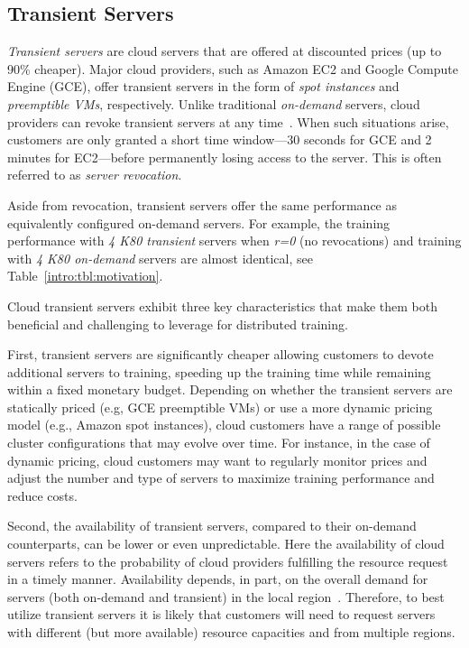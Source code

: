 \subsection{Transient Servers}
\label{subsec:transient}

\emph{Transient servers} are cloud servers that are offered at discounted
prices (up to 90\% cheaper). Major cloud providers, such as Amazon EC2 and
Google Compute Engine (GCE), offer transient servers in the form
of \emph{spot instances} and \emph{preemptible VMs}, respectively. Unlike traditional \emph{on-demand}
servers, cloud providers can revoke transient servers at any
time~\cite{ec2_spot,gce_preemptible}. When such situations arise, customers are
only granted a short time window---30 seconds for GCE and 2 minutes for
EC2---before permanently losing access to the server. This is often referred to
as \emph{server revocation}.

Aside from revocation, transient servers offer the same performance as
equivalently configured on-demand servers. For example, the training
performance with \emph{4 K80 transient} servers when \emph{r=0} (no
revocations) and training with \emph{4 K80 on-demand} servers are almost
identical, see Table~\ref{intro:tbl:motivation}.
  

Cloud transient servers exhibit three key characteristics that make them both
beneficial and challenging to leverage for distributed training. 

First, transient servers are significantly cheaper allowing customers to devote
additional servers to training, speeding up the training time while remaining
within a fixed monetary budget.  Depending on whether the transient servers are
statically priced (e.g, GCE preemptible VMs) or use a more dynamic pricing
model (e.g., Amazon spot instances), cloud customers have a range of possible
cluster configurations  that may evolve over time. For instance, in the case of
dynamic pricing, cloud customers may want to regularly monitor prices and
adjust the number and type of servers to maximize training performance and reduce
costs.


Second, the availability of transient servers, compared to their on-demand
counterparts, can be lower or even unpredictable.  Here the availability of
cloud servers refers to the probability of cloud providers fulfilling the
resource request in a timely manner. 
Availability depends, in part, on the overall demand for servers (both
on-demand and transient) in the local region~\cite{spotlight}.  Therefore, to
best utilize transient servers it is likely that customers will need to request
servers with different (but more available) resource capacities and from multiple regions.

